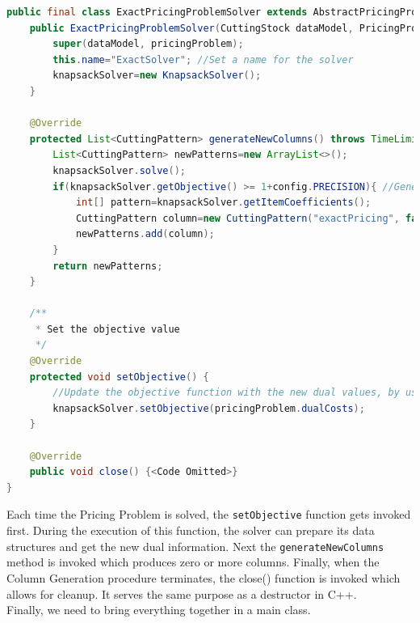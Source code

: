 \documentclass[a4paper]{article}
\newenvironment{myblock}[1]{%
    \tcolorbox[beamer,%
    noparskip,breakable,
    colback=lightBlueCodeBlock,colframe=darkBlueCodeBlock,%
    colbacklower=darkBlueCodeBlock!75!lightBlueCodeBlock,%
    coltitle=blueTitleCodeBlock,
    title=#1]}%
    {\endtcolorbox}
\newcommand{\code}[1]{\lstinline[language=java, style=seminar]!#1!}
\begin{document}
\begin{myblock}{ExactPricingProblemSolver}
\begin{lstlisting}[language=java, style=eclipseArticle, xleftmargin=2em]  
public final class ExactPricingProblemSolver extends AbstractPricingProblemSolver<CuttingStock, CuttingPattern, PricingProblem> {
	public ExactPricingProblemSolver(CuttingStock dataModel, PricingProblem pricingProblem) {
		super(dataModel, pricingProblem);
		this.name="ExactSolver"; //Set a name for the solver
		knapsackSolver=new KnapsackSolver();
	}
	
	@Override
	protected List<CuttingPattern> generateNewColumns() throws TimeLimitExceededException {
		List<CuttingPattern> newPatterns=new ArrayList<>();
		knapsackSolver.solve();
		if(knapsackSolver.getObjective() >= 1+config.PRECISION){ //Generate new column
			int[] pattern=knapsackSolver.getItemCoefficients();
			CuttingPattern column=new CuttingPattern("exactPricing", false, pattern, pricingProblem);
			newPatterns.add(column);
		}
		return newPatterns;
	}

	/**
	 * Set the objective value
	 */
	@Override
	protected void setObjective() {
		//Update the objective function with the new dual values, by using the fields in the pricingProblem, e.g. pricingProblem.dualCosts
		knapsackSolver.setObjective(pricingProblem.dualCosts);
	}

	@Override
	public void close() {<Code Omitted>}
}
\end{lstlisting}
\end{myblock}
Each time the Pricing Problem is solved, the \code{setObjective} function gets invoked first. During the execution of this function, the solver can prepare its data structures and get the new dual information. Next the \code{generateNewColumns} method is invoked which produces zero or more columns. Finally, when the Column Generation procedure terminates, the close() function is invoked which allows for cleanup. It serves the same purpose as a destructor in C++.\\
Finally, we need to bring everything together in a main class.
\end{document}
